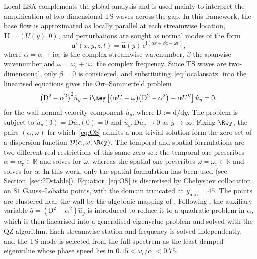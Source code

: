 \documentclass[lineno]{jfm}
\begin{document}
Local \ac{LSA} complements the global analysis and is used mainly to interpret the amplification of two-dimensional \ac{TS} waves across the gap. In this framework, the base flow is approximated as locally parallel at each streamwise location, $\boldsymbol{U}=(U(y),0)$, and perturbations are sought as normal modes of the form
\begin{equation}\label{eq:localansatz}
	\boldsymbol{u}'(x,y,z,t)
	=
	\hat{\boldsymbol{u}}(y)\,\mathrm{e}^{\mathrm{i}(\alpha x + \beta z - \omega t)},
\end{equation}
where $\alpha =\alpha_\mathrm{r}  + \mathrm{i}\alpha_\mathrm{i} $ is the complex streamwise wavenumber, $\beta $ the spanwise wavenumber and $\omega =\omega_\mathrm{r} +\mathrm{i}\omega_\mathrm{i} $ the complex frequency. Since \ac{TS} waves are two-dimensional, only $\beta=0$ is considered, and substituting~\eqref{eq:localansatz} into the linearised equations gives the Orr--Sommerfeld problem \citep{schmid2001stability}%
\begin{equation}\label{eq:OS}
	{\big({\mathrm{D}}^2-{\alpha}^2\big)}^2\hat{u}_y
	-\mathrm{i}\Rey\left[
		(\alpha U-\omega)\big({\mathrm{D}}^2-{\alpha}^2\big)
		-\alpha U''\right]\hat{u}_y=0,
\end{equation}
for the wall-normal velocity component $\hat{u}_y$, where $\mathrm{D}:=\mathrm{d}/\mathrm{d}y$. The problem is subject to $\hat{u}_y(0)=\mathrm{D}\hat{u}_y(0)=0$ and $\hat{u}_y,\mathrm{D}\hat{u}_y\to0$ as $y\to\infty$. Fixing $\Rey$, the pairs $(\alpha,\omega)$ for which~\eqref{eq:OS} admits a non-trivial solution form the zero set of a dispersion function $\mathcal{D}(\alpha,\omega;\Rey)$. The temporal and spatial formulations are two different real restrictions of this same zero set: the temporal one prescribes $\alpha=\alpha_\mathrm{r}\in\mathbb{R}$ and solves for $\omega$, whereas the spatial one prescribes $\omega=\omega_\mathrm{r}\in\mathbb{R}$ and solves for $\alpha$. In this work, only the spatial formulation has been used (see Section~\ref{sec:2Dstable}). Equation~\eqref{eq:OS} is discretised by Chebyshev collocation on $81$ Gauss--Lobatto points, with the domain truncated at $y_{\max}=45$. The points are clustered near the wall by the algebraic mapping of \citet{malik1990}. Following \citet{bridgesMorris1984}, the auxiliary variable $\hat{q}=({\mathrm{D}}^2-\alpha^2)\hat{u}_y$ is introduced to reduce it to a quadratic problem in $\alpha$, which is then linearised into a generalised eigenvalue problem and solved with the QZ algorithm. Each streamwise station and frequency is solved independently, and the \ac{TS} mode is selected from the full spectrum as the least damped eigenvalue whose phase speed lies in $0.15<\omega_\mathrm{r}/\alpha_\mathrm{r}<0.75$.
\end{document}
